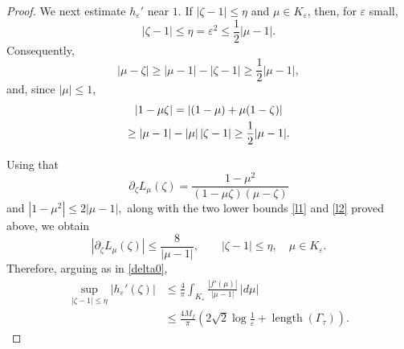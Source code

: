 \documentclass[10pt,a4paper]{amsart}
\begin{document}
\begin{proof}
We next estimate \(h_\varepsilon'\) near \(1\).  If
\(|\zeta-1|\le\eta\) and \(\mu\in K_\varepsilon\), then, for
\(\varepsilon\) small,
\[
        |\zeta-1|\le\eta=\varepsilon^2
        \le \frac12|\mu-1|.
\]
Consequently,
\begin{equation}\label{l1}
        |\mu-\zeta|
        \ge
        |\mu-1|-|\zeta-1|
        \ge
        \frac12|\mu-1|,
\end{equation}
and, since \(|\mu|\le1\),
\begin{gather}\label{l2}
        |1-\mu\zeta|
        =
        |(1-\mu)+\mu(1-\zeta)|  \\
        \ge
        |\mu-1|-|\mu|\,|\zeta-1|
        \ge
        \frac12|\mu-1|.\notag
\end{gather}


Using that
\[
        \partial_\zeta L_\mu(\zeta)
        =
        \frac{1-\mu^2}{(1-\mu\zeta)(\mu-\zeta)}
\]
and
\(
        |1-\mu^2|
        \le
        2|\mu-1|, 
\)
along with the two lower bounds \eqref{l1} and \eqref{l2} proved above, we obtain
\[
        |\partial_\zeta L_\mu(\zeta)|
        \le
        \frac{8}{|\mu-1|},
        \qquad
        |\zeta-1|\le\eta,\quad \mu\in K_\varepsilon.
\]
Therefore, arguing as in \eqref{delta0},
\[
\begin{aligned}
   \sup_{|\zeta-1|\le\eta}|h_\varepsilon'(\zeta)|
   &\le
   \frac4\pi
   \int_{K_\varepsilon}
        \frac{|f'(\mu)|}{|\mu-1|}\,|d\mu| \\
   &\le
   \frac{4M_f}{\pi}
   \left(
      2\sqrt2\log\frac1\varepsilon
      +
      \operatorname{length}(\Gamma_\tau)
   \right).
\end{aligned}
\]



\end{proof}
\end{document}
